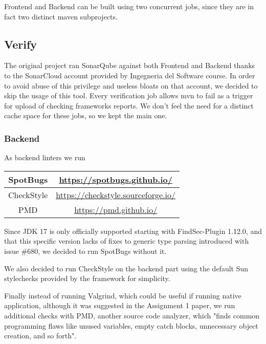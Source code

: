 \documentclass[a4paper,10pt]{scrartcl}
\begin{document}
Frontend and Backend can be built using two concurrent jobs, since they are in fact two distinct maven subprojects.

\subsection{Verify}

The original project ran SonarQube against both Frontend and Backend thanks to the SonarCloud account provided by Ingegneria del Software course. In order to avoid abuse of this privilege and useless bloats on that account, we decided to skip the usage of this tool.
Every verification job allows mvn to fail as a trigger for upload of checking frameworks reports. We don't feel the need for a distinct cache space for these jobs, so we kept the main one.

\subsubsection{Backend}
 
As backend linters we run

\begin{center}
    \begin{tabular}{|c|c|}
        \hline
        SpotBugs & \href{https://spotbugs.github.io/}{https://spotbugs.github.io/} \\
        \hline
        CheckStyle & \href{https://checkstyle.sourceforge.io/}{https://checkstyle.sourceforge.io/} \\
        \hline
        PMD & \href{https://pmd.github.io/}{https://pmd.github.io/} \\
        \hline
    \end{tabular}
\end{center}

Since JDK 17 is only officially supported starting with FindSec-Plugin 1.12.0, and that this specific version lacks of fixes to generic type parsing introduced with issue \#680, we decided to run SpotBugs without it.

We also decided to run CheckStyle on the backend part using the default Sun stylechecks provided by the framework for simplicity.

Finally instead of running Valgrind, which could be useful if running native application, although it was suggested in the Assignment 1 paper, we run additional checks with PMD, another source code analyzer, which "finds common programming flaws like unused variables, empty catch blocks, unnecessary object creation, and so forth".
\end{document}
